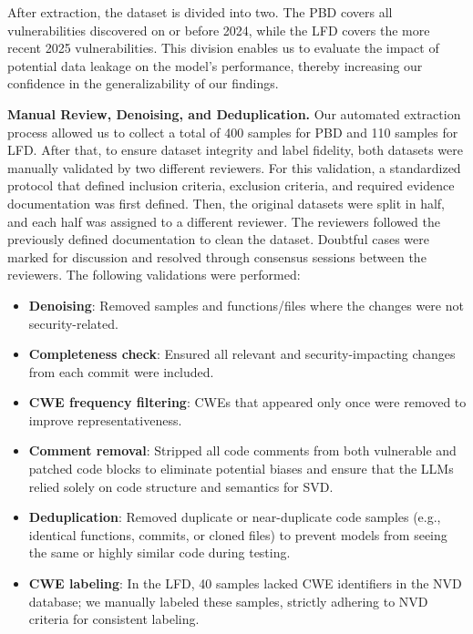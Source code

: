 \documentclass[lettersize,journal]{IEEEtran}
\begin{document}
After extraction, the dataset is divided into two. The \gls{PBD} covers all vulnerabilities discovered on or before 2024, while the \gls{LFD} covers the more recent 2025 vulnerabilities. This division enables us to evaluate the impact of potential data leakage on the model's performance, thereby increasing our confidence in the generalizability of our findings.

\textbf{Manual Review, Denoising, and Deduplication.} Our automated extraction process allowed us to collect a total of 400 samples for PBD and 110 samples for LFD. After that, to ensure dataset integrity and label fidelity, both datasets were manually validated by two different reviewers. For this validation, a standardized protocol that defined inclusion criteria, exclusion criteria, and required evidence documentation was first defined. Then, the original datasets were split in half, and each half was assigned to a different reviewer. The reviewers followed the previously defined documentation to clean the dataset. Doubtful cases were marked for discussion and resolved through consensus sessions between the reviewers. The following validations were performed:

\begin{itemize}
    \item \textbf{Denoising}: Removed samples and functions/files where the changes were not security-related.
    \item \textbf{Completeness check}: Ensured all relevant and security-impacting changes from each commit were included.
    \item \textbf{\gls{CWE} frequency filtering}: CWEs that appeared only once were removed to improve representativeness.
    \item \textbf{Comment removal}: Stripped all code comments from both vulnerable and patched code blocks to eliminate potential biases and ensure that the \glspl{LLM} relied solely on code structure and semantics for \gls{SVD}.
    \item \textbf{Deduplication}: Removed duplicate or near-duplicate code samples (e.g., identical functions, commits, or cloned files) to prevent models from seeing the same or highly similar code during testing.
    \item \textbf{\gls{CWE} labeling}: In the LFD, 40 samples lacked \gls{CWE} identifiers in the NVD database; we manually labeled these samples, strictly adhering to NVD criteria for consistent labeling.
\end{itemize}
\end{document}
